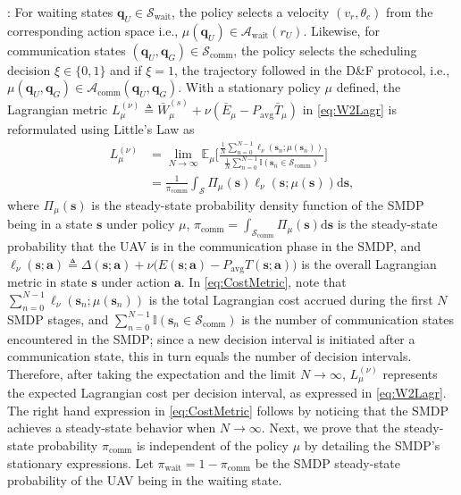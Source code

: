 \documentclass[10pt, twocolumn]{IEEEtran}
\theoremstyle{plain}
\theoremstyle{definition}
\theoremstyle{remark}
\begin{document}
: For {waiting} states $\mathbf{q}_{U}{\in}\mathcal{S}_{\mathrm{wait}}$, the policy selects a velocity $(v_{r},\theta_{c})$ from the corresponding action space i.e., $\mu(\mathbf{q}_{U}){\in}\mathcal{A}_{\mathrm{wait}}(r_{U})$. Likewise, for {communication} states $(\mathbf{q}_{U},\mathbf{q}_{G}){\in}\mathcal{S}_{\mathrm{comm}}$, the policy selects the scheduling decision $\xi{\in}\{0,1\}$ and if $\xi{=}1$, the trajectory followed in the D\&F protocol, i.e., $\mu(\mathbf{q}_{U},\mathbf{q}_{G}){\in}\mathcal{A}_{\mathrm{comm}}(\mathbf{q}_{U},\mathbf{q}_{G})$. With a stationary policy $\mu$ defined, the Lagrangian metric $L_{\mu}^{(\nu)}{\triangleq}\bar{W}_{\mu}^{(s)}{+}\nu(\bar{E}_{\mu}{-}P_{\mathrm{avg}}\bar{T}_{\mu})$ in \eqref{eq:W2Lagr} is reformulated using Little's Law \cite{LittlesLaw} as
\begin{align}\label{eq:CostMetric}
    L_\mu^{(\nu)}
    &= \lim_{N \rightarrow \infty} \mathbb{E}_\mu \Bigg[ \frac{\frac{1}{N}\sum_{n=0}^{N-1}  \ell_\nu(\mathbf{s}_n; \mu(\mathbf{s}_n)) }{\frac{1}{N}\sum_{n = 0}^{N-1} \mathbb I(\mathbf{s}_n \in \mathcal{S}_{\mathrm{comm}})}  \Bigg]\nonumber\\
    &= \frac{1}{\pi_{\mathrm{comm}}}\int_{\mathcal{S}} \Pi_{\mu}(\mathbf{s})\ell_\nu(\mathbf{s}; \mu(\mathbf{s}))\mathrm{d}\mathbf{s},
\end{align}
where $\Pi_{\mu}(\mathbf{s})$ is the steady-state probability density function of the SMDP being in a state $\mathbf{s}$ under policy $\mu$, $\pi_{\mathrm{comm}}{=}\int_{\mathcal{S}_{\mathrm{comm}}}\!\!\!\!\!\Pi_{\mu}(\mathbf{s})\mathrm{d}\mathbf{s}$ is the  steady-state probability that the UAV is in the communication phase in the SMDP, and $\ell_{\nu}(\mathbf{s};\mathbf{a}){\triangleq}\Delta(\mathbf{s};\mathbf{a}){+}\nu\big(E(\mathbf{s};\mathbf{a}){-}P_{\mathrm{avg}}T(\mathbf{s};\mathbf{a})\big)$ is the overall Lagrangian metric in state $\mathbf{s}$ under action $\mathbf{a}$.
In \eqref{eq:CostMetric}, note that $\sum_{n=0}^{N{-}1}\ell_{\nu}(\mathbf{s}_{n};\mu(\mathbf{s}_{n}))$ is the total Lagrangian cost accrued during the first $N$ SMDP stages, and $\sum_{n{=}0}^{N{-}1}\mathbb{I}(\mathbf{s}_{n}{\in}\mathcal{S}_{\mathrm{comm}})$ is the number of communication states encountered in the SMDP; since a new decision interval is initiated after a communication state, this in turn equals the number of decision intervals. Therefore, after taking the expectation and the limit $N{\to}\infty$, $L_{\mu}^{(\nu)}$ represents the expected Lagrangian cost per decision interval, as expressed in \eqref{eq:W2Lagr}. The right hand expression in \eqref{eq:CostMetric} follows by noticing that the SMDP achieves a steady-state behavior when $N\to\infty$. Next, we prove that the steady-state probability $\pi_{\mathrm{comm}}$ is independent of the policy $\mu$ by detailing the SMDP's stationary expressions. Let $\pi_{\mathrm{wait}}{=}1{-}\pi_{\mathrm{comm}}$ be the SMDP steady-state probability of the UAV being in the waiting state.
\end{document}
